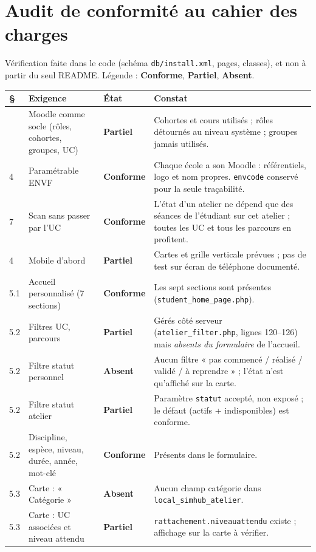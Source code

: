 \documentclass[11pt,a4paper]{article}
\newcommand{\OK}{\textcolor{ok}{\textbf{Conforme}}}
\newcommand{\PART}{\textcolor{part}{\textbf{Partiel}}}
\newcommand{\KO}{\textcolor{ko}{\textbf{Absent}}}
\newcommand{\code}[1]{\texttt{\small #1}}
\begin{document}
\section{Audit de conformité au cahier des charges}

Vérification faite dans le code (schéma \code{db/install.xml}, pages, classes), et non à
partir du seul README. Légende : \OK, \PART, \KO.

\renewcommand{\arraystretch}{1.15}
\begin{longtable}{>{\raggedright}p{1.3cm}>{\raggedright}p{4.2cm}p{1.95cm}>{\raggedright\arraybackslash}p{7.05cm}}
\toprule
\textbf{§} & \textbf{Exigence} & \textbf{État} & \textbf{Constat} \\
\midrule\endhead
\bottomrule\endfoot
4 & Moodle comme socle (rôles, cohortes, groupes, UC) & \PART & Cohortes et cours utilisés ;
rôles détournés au niveau système ; groupes jamais utilisés. \\
4 & Paramétrable ENVF & \OK & Chaque école a son Moodle : référentiels, logo et nom
propres. \code{envcode} conservé pour la seule traçabilité. \\
7 & Scan sans passer par l'UC & \OK & L'état d'un atelier ne dépend que des séances de
l'étudiant sur cet atelier ; toutes les UC et tous les parcours en profitent. \\
4 & Mobile d'abord & \PART & Cartes et grille verticale prévues ; pas de test sur écran de
téléphone documenté. \\
5.1 & Accueil personnalisé (7 sections) & \OK & Les sept sections sont présentes
(\code{student\_home\_page.php}). \\
5.2 & Filtres UC, parcours & \PART & Gérés côté serveur (\code{atelier\_filter.php}, lignes
120--126) mais \emph{absents du formulaire} de l'accueil. \\
5.2 & Filtre statut personnel & \KO & Aucun filtre « pas commencé / réalisé / validé / à
reprendre » ; l'état n'est qu'affiché sur la carte. \\
5.2 & Filtre statut atelier & \PART & Paramètre \code{statut} accepté, non exposé ; le défaut
(actifs + indisponibles) est conforme. \\
5.2 & Discipline, espèce, niveau, durée, année, mot-clé & \OK & Présents dans le formulaire. \\
5.3 & Carte : « Catégorie » & \KO & Aucun champ catégorie dans
\code{local\_simhub\_atelier}. \\
5.3 & Carte : UC associées et niveau attendu & \PART & \code{rattachement.niveauattendu}
existe ; affichage sur la carte à vérifier. \\

\end{longtable}
\end{document}
